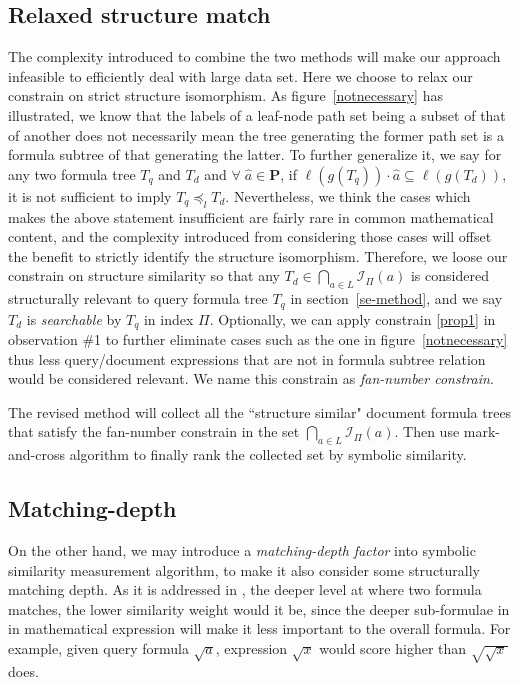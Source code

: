 \subsection{Relaxed structure match}
The complexity introduced to combine the two methods will make our approach infeasible to efficiently deal with large data set. 
Here we choose to relax our constrain on strict structure isomorphism. 
As figure~\ref{notnecessary} has illustrated, we know that the labels of a leaf-node path set being a subset of that of another does not necessarily mean the tree generating the former path set is a formula subtree of that generating the latter.
To further generalize it, we say for any two formula tree $T_q$ and $T_d$ and $\forall\; \hat{a} \in \mathbf{P}$, if $\ell(g(T_q)) \cdot \hat{a} \subseteq \ell(g(T_d))$, it is not sufficient to imply $T_q \preceq_l T_d$.
Nevertheless, we think the cases which makes the above statement insufficient are fairly rare in common mathematical content, and the complexity introduced from considering those cases will offset the benefit to strictly identify the structure isomorphism.
Therefore, we loose our constrain on structure similarity so that any  $T_d \in \bigcap_{a \in L} \mathcal{I}_{\Pi}(a) $ is considered structurally relevant to query formula tree $T_q$ in section~\ref{se-method},
and we say $T_d$ is \textit{searchable} by $T_q$ in index $\Pi$.
Optionally, we can apply constrain \ref{prop1} in observation \#1 to further eliminate cases such as the one in figure~\ref{notnecessary} thus less query/document expressions that are not in formula subtree relation would be considered relevant. We name this constrain as \textit{fan-number constrain}.

The revised method will collect all the ``structure similar" document formula trees that satisfy the fan-number constrain in the set $\bigcap_{a \in L} \mathcal{I}_{\Pi}(a)$. 
Then use mark-and-cross algorithm to finally rank the collected set by symbolic similarity.

\subsection{Matching-depth}
On the other hand, we may introduce a \textit{matching-depth factor} into symbolic similarity measurement algorithm, to make it also consider some structurally matching depth. 
As it is addressed in \cite{mias11a}, the deeper level at where two formula matches, the lower similarity weight would it be, since the deeper sub-formulae in in mathematical expression will make it less important to the overall formula.
For example, given query formula $\sqrt a$, expression $\sqrt {x}$ would score higher than $\sqrt{\sqrt{x}}$ does. 


